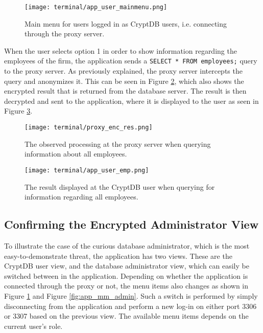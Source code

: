 \begin{figure}
	\centering
	\texttt{[image: terminal/app\_user\_mainmenu.png]}
	\caption{Main menu for users logged in as CryptDB users, i.e. connecting through the proxy server.}
	\label{fig:app_mm_user}
\end{figure}

When the user selects option 1 in order to show information regarding the employees of the firm, the application sends a \verb!SELECT * FROM employees;! query to the proxy server. As previously explained, the proxy server intercepts the query and anonymizes it. This can be seen in Figure \ref{fig:proxy_enc_res}, which also shows the encrypted result that is returned from the database server. The result is then decrypted and sent to the application, where it is displayed to the user as seen in Figure \ref{fig:app_user_emp}.

\begin{figure}
	\centering
	\texttt{[image: terminal/proxy\_enc\_res.png]}
	\caption{The observed processing at the proxy server when querying information about all employees.}
	\label{fig:proxy_enc_res}
\end{figure}


\begin{figure}
	\centering
	\texttt{[image: terminal/app\_user\_emp.png]}
	\caption{The result displayed at the CryptDB user when querying for information regarding all employees.}
	\label{fig:app_user_emp}
\end{figure}


\subsection{Confirming the Encrypted Administrator View}

To illustrate the case of the curious database administrator, which is the most easy-to-demonstrate threat, the application has two views. These are the CryptDB user view, and the database administrator view, which can easily be switched between in the application. Depending on whether the application is connected through the proxy or not, the menu items also changes as shown in Figure \ref{fig:app_mm_user} and Figure \ref{fig:app_mm_admin}. Such a switch is performed by simply disconnecting from the application and perform a new log-in on either port 3306 or 3307 based on the previous view. The available menu items depends on the current user's role.


